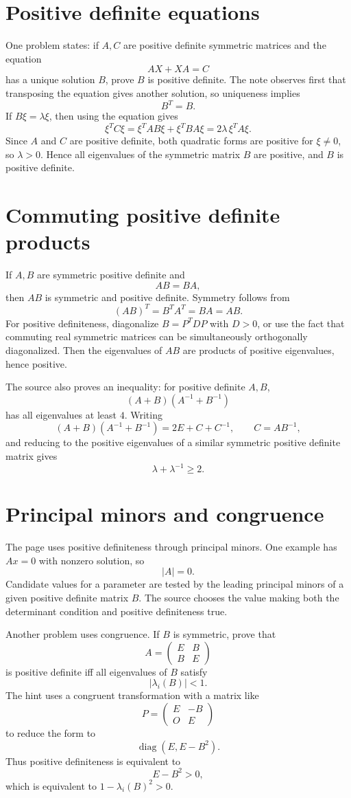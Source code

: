 \section{Positive definite equations}

One problem states: if $A,C$ are positive definite symmetric matrices and the equation
\[
  AX+XA=C
\]
has a unique solution $B$, prove $B$ is positive definite.  The note observes first that transposing the equation gives another solution, so uniqueness implies
\[
  B^T=B.
\]
If $B\xi=\lambda\xi$, then using the equation gives
\[
  \xi^TC\xi
  =
  \xi^TAB\xi+\xi^TBA\xi
  =
  2\lambda\,\xi^TA\xi.
\]
Since $A$ and $C$ are positive definite, both quadratic forms are positive for $\xi\ne0$, so $\lambda>0$.  Hence all eigenvalues of the symmetric matrix $B$ are positive, and $B$ is positive definite.

\section{Commuting positive definite products}

If $A,B$ are symmetric positive definite and
\[
  AB=BA,
\]
then $AB$ is symmetric and positive definite.  Symmetry follows from
\[
  (AB)^T=B^TA^T=BA=AB.
\]
For positive definiteness, diagonalize $B=P^TDP$ with $D>0$, or use the fact that commuting real symmetric matrices can be simultaneously orthogonally diagonalized.  Then the eigenvalues of $AB$ are products of positive eigenvalues, hence positive.

The source also proves an inequality: for positive definite $A,B$,
\[
  (A+B)(A^{-1}+B^{-1})
\]
has all eigenvalues at least $4$.  Writing
\[
  (A+B)(A^{-1}+B^{-1})=2E+C+C^{-1},\qquad C=AB^{-1},
\]
and reducing to the positive eigenvalues of a similar symmetric positive definite matrix gives
\[
  \lambda+\lambda^{-1}\ge2.
\]

\section{Principal minors and congruence}

The page uses positive definiteness through principal minors.  One example has $Ax=0$ with nonzero solution, so
\[
  |A|=0.
\]
Candidate values for a parameter are tested by the leading principal minors of a given positive definite matrix $B$.  The source chooses the value making both the determinant condition and positive definiteness true.

Another problem uses congruence.  If $B$ is symmetric, prove that
\[
  A=\begin{pmatrix}E&B\\B&E\end{pmatrix}
\]
is positive definite iff all eigenvalues of $B$ satisfy
\[
  |\lambda_i(B)|<1.
\]
The hint uses a congruent transformation with a matrix like
\[
  P=\begin{pmatrix}E&-B\\O&E\end{pmatrix}
\]
to reduce the form to
\[
  \operatorname{diag}(E,E-B^2).
\]
Thus positive definiteness is equivalent to
\[
  E-B^2>0,
\]
which is equivalent to $1-\lambda_i(B)^2>0$.

